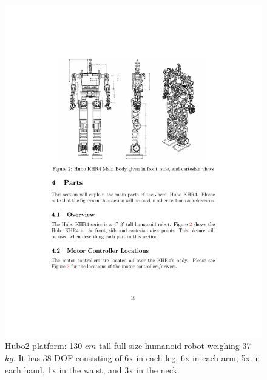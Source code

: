 \begin{figure}[thpb]
  \centering
\includegraphics[width=1.0\columnwidth]{./pix/huboSkel.pdf}
  \caption{Hubo2 platform: 130 $cm$ tall full-size humanoid robot weighing 37 $kg$.  It has 38 DOF consisting of 6x in each leg, 6x in each arm, 5x in each hand, 1x in the waist, and 3x in the neck.}
  \label{fig:hubo}
\end{figure}




